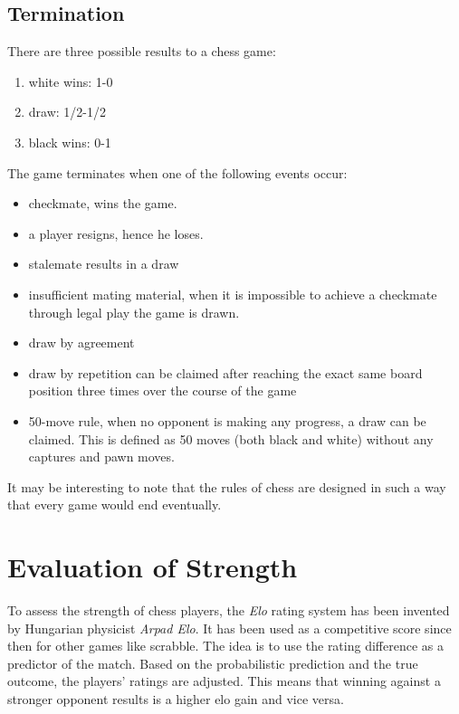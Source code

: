 \subsection{Termination}
\label{subsec:termination}
There are three possible results to a chess game:
\begin{enumerate}
\item white wins: 1-0
\item draw: 1/2-1/2
\item black wins: 0-1
\end{enumerate}
The game terminates when one of the following events occur:
\begin{itemize}
\item checkmate, wins the game.
\item a player resigns, hence he loses.
\item stalemate results in a draw
\item insufficient mating material, when it is impossible to achieve a checkmate through legal play the game is drawn.
\item draw by agreement
\item draw by repetition can be claimed after reaching the exact same board position three times over the course of the game
\item 50-move rule, when no opponent is making any progress, a draw can be claimed. This is defined as 50 moves (both black and white) without any captures and pawn moves.
\end{itemize}
It may be interesting to note that the rules of chess are designed in such a way that every game would end eventually.

\section{Evaluation of Strength}
\label{sec:elo}
To assess the strength of chess players, the \textit{Elo} rating system has been invented by Hungarian physicist \textit{Arpad Elo}. It has been used as a competitive score since then for other games like scrabble. The idea is to use the rating difference as a predictor of the match. Based on the probabilistic prediction and the true outcome, the players' ratings are adjusted. This means that winning against a stronger opponent results is a higher elo gain and vice versa.\\

